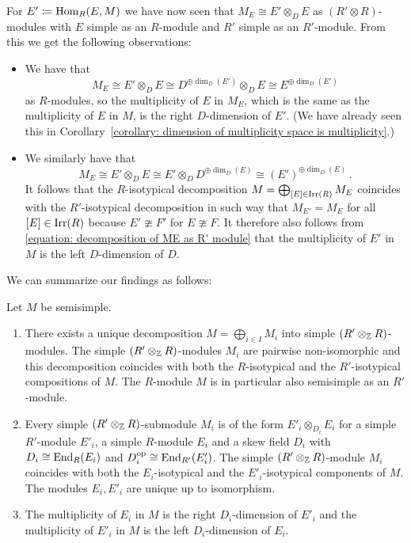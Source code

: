

\begin{fluff}
  For $E' \coloneqq \operatorname{Hom}_R(E,M)$ we have now seen that $M_E \cong E' \otimes_D E$ as $(R' \otimes R)$-modules with $E$ simple as an $R$-module and $R'$ simple as an $R'$-module.
  From this we get the following observations:
  \begin{itemize}
    \item
      We have that
      \[
              M_E
        \cong E' \otimes_D E
        \cong D^{\oplus \dim_D(E')} \otimes_D E
        \cong E^{\oplus \dim_D(E')}
      \]
      as $R$-modules, so the multiplicity of $E$ in $M_E$, which is the same as the multiplicity of $E$ in $M$, is the right $D$-dimension of $E'$.
      (We have already seen this in Corollary~\ref{corollary: dimension of multiplicity space is multiplicity}.)
    \item
      We similarly have that
      \begin{equation}
        \label{equation: decomposition of ME as R' module}
              M_E
        \cong E' \otimes_D E
        \cong E' \otimes_D D^{\oplus \dim_D(E)}
        \cong (E')^{\oplus \dim_D(E)} \,.
      \end{equation}
      It follows that the $R$-isotypical decomposition $M = \bigoplus_{[E] \in \operatorname{Irr}(R)} M_E$ coincides with the $R'$-isotypical decomposition in such way that $M_{E'} = M_E$ for all $[E] \in \operatorname{Irr}(R)$ because $E' \ncong F'$ for $E \ncong F$.
      It therefore also follows from \eqref{equation: decomposition of ME as R' module} that the multiplicity of $E'$ in $M$ is the left $D$-dimension of $D$.
  \end{itemize}
  We can summarize our findings as follows:
\end{fluff}


\begin{theorem}
  Let $M$ be semisimple.
  \begin{enumerate}
    \item
      There exists a unique decomposition $M  = \bigoplus_{i \in I} M_i$ into simple $(R' \otimes_{\mathbb{Z}} R)$-modules.
      The simple $(R' \otimes_{\mathbb{Z}} R)$-modules $M_i$ are pairwise non-isomorphic and this decomposition coincides with both the $R$-isotypical and the $R'$-isotypical compositions of $M$.
      The $R$-module $M$ is in particular also semisimple as an $R'$-module.
    \item
      \label{enumerate: simple modules are tensor products}
      Every simple $(R' \otimes_{\mathbb{Z}} R)$-submodule $M_i$ is of the form $E'_i \otimes_{D_i} E_i$ for a simple $R'$-module $E'_i$, a simple $R$-module $E_i$ and a skew field $D_i$ with $D_i \cong \operatorname{End}_R(E_i)$ and $D_i^{\operatorname{op}} \cong \operatorname{End}_{R'}(E'_i)$.
      The simple $(R' \otimes_{\mathbb{Z}} R)$-module $M_i$ coincides with both the $E_i$-isotypical and the $E'_i$-isotypical components of $M$.
      The modules $E_i, E'_i$ are unique up to isomorphism.
    \item
      The multiplicity of $E_i$ in $M$ is the right $D_i$-dimension of $E'_i$ and the multiplicity of $E'_i$ in $M$ is the left $D_i$-dimension of $E_i$.
  \end{enumerate}
\end{theorem}


